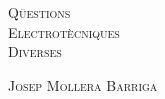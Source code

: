 \pagecolor{colorPortada}


\begin{titlepage}
   \parbox{18cm}{\fontsize{60pt}{60pt}\selectfont\color{NavyBlue}\scshape%
                 Qüestions\\[20pt] Electrotècniques\\[20pt] Diverses}
   \vspace*{35mm}
   \begin{center}
      
   \end{center}
   \vspace*{5mm}
   \fontsize{30pt}{30pt}\selectfont\color{NavyBlue}\textsc{Josep Mollera Barriga}
\end{titlepage}

\pagecolor{white}
